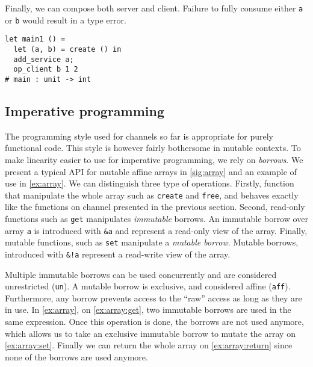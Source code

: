 
Finally, we can compose both server and client.
Failure to fully consume either \lstinline/a/ or \lstinline/b/
would result in a type error.
\begin{lstlisting}
let main1 () =
  let (a, b) = create () in
  add_service a;
  op_client b 1 2
# main : unit -> int
\end{lstlisting}



\subsection{Imperative programming}

The programming style used for channels so far is
appropriate for purely functional code.
This style is however fairly bothersome in mutable contexts.
%
To make linearity easier to use for imperative programming, we rely on
{\em borrows}. We present a typical API for mutable affine arrays
in \cref{sig:array} and an example of use in \cref{ex:array}.
We can distinguish three type of operations. Firstly,
function that manipulate the whole
array such as \lstinline/create/ and \lstinline/free/, and behaves exactly
like the functions on channel presented in the previous section.
Second, read-only functions such as \lstinline/get/
manipulates \emph{immutable} borrows. An immutable borrow over array \lstinline/a/
is introduced with \lstinline/&a/ and represent a read-only view of the array.
Finally, mutable functions, such as \lstinline/set/ manipulate
a \emph{mutable borrow}. Mutable borrows, introduced with \lstinline/&!a/
represent a read-write view of the array.

Multiple immutable borrows can be used concurrently and are considered
unrestricted (\lstinline/un/).
A mutable borrow is exclusive, and considered affine (\lstinline/aff/).
Furthermore, any borrow prevents access to the ``raw'' access
as long as they are in use. In \cref{ex:array}, on \cref{ex:array:get},
two immutable borrows are used in the same expression. Once this operation
is done, the borrows are not used anymore, which allows us to take
an exclusive immutable borrow to mutate the array on \cref{ex:array:set}.
Finally we can return the whole array on \cref{ex:array:return} since
none of the borrows are used anymore.

